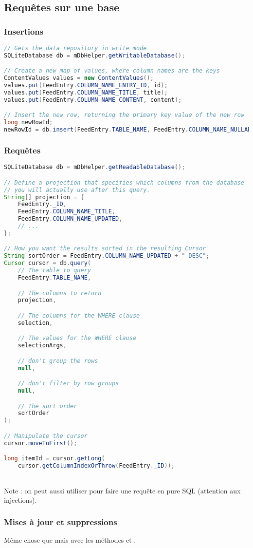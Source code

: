 \subsection{Requêtes sur une base}
\subsubsection{Insertions}
\begin{lstlisting}[language=java]
// Gets the data repository in write mode
SQLiteDatabase db = mDbHelper.getWritableDatabase();

// Create a new map of values, where column names are the keys
ContentValues values = new ContentValues();
values.put(FeedEntry.COLUMN_NAME_ENTRY_ID, id);
values.put(FeedEntry.COLUMN_NAME_TITLE, title);
values.put(FeedEntry.COLUMN_NAME_CONTENT, content);

// Insert the new row, returning the primary key value of the new row
long newRowId;
newRowId = db.insert(FeedEntry.TABLE_NAME, FeedEntry.COLUMN_NAME_NULLABLE, values);
\end{lstlisting}

\subsubsection{Requêtes}
\begin{lstlisting}[language=java]
SQLiteDatabase db = mDbHelper.getReadableDatabase();

// Define a projection that specifies which columns from the database
// you will actually use after this query.
String[] projection = {
    FeedEntry._ID,
    FeedEntry.COLUMN_NAME_TITLE,
    FeedEntry.COLUMN_NAME_UPDATED,
    // ...
};

// How you want the results sorted in the resulting Cursor
String sortOrder = FeedEntry.COLUMN_NAME_UPDATED + " DESC";
Cursor cursor = db.query(
    // The table to query
    FeedEntry.TABLE_NAME,

    // The columns to return
    projection,

    // The columns for the WHERE clause
    selection,

    // The values for the WHERE clause
    selectionArgs,

    // don't group the rows
    null,

    // don't filter by row groups
    null,

    // The sort order
    sortOrder
);

// Manipulate the cursor
cursor.moveToFirst();

long itemId = cursor.getLong(
    cursor.getColumnIndexOrThrow(FeedEntry._ID));
\end{lstlisting}

\noindent\\ Note : on peut aussi utiliser  pour
faire une requête en pure SQL (attention aux injections).

\subsubsection{Mises à jour et suppressions}
Même chose que  mais avec les méthodes  et .
